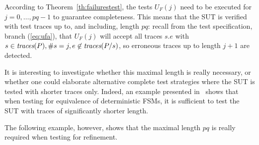 According to Theorem~\ref{th:failurestest}, the tests $U_F(j)$ need to be
executed for $j = 0,\dots,pq-1$ to guarantee completeness.
 This means that the SUT is verified with test
traces up to, and including, length $pq$: recall from the test specification,
branch (\ref{eq:ufa}), that $U_F(j)$ will accept all traces $s.e$ with
$s\in\text{\it traces}(P), \#s = j, e\not\in\text{\it traces}(P/s)$, so erroneous traces up to length
$j+1$ are detected.

It is interesting to investigate whether this maximal length is really
necessary, or whether one could elaborate alternative complete test
strategies where the SUT is tested with shorter traces only. Indeed, an
example  presented in~\cite[Exercise~5]{PeleskaHuangLectureNotesMBT} shows
that when testing for equivalence of deterministic FSMs, it is sufficient to
test the SUT with traces of significantly shorter length.

The following example, however, shows that the maximal length $pq$ is really
required when testing for refinement.
%
%
%

